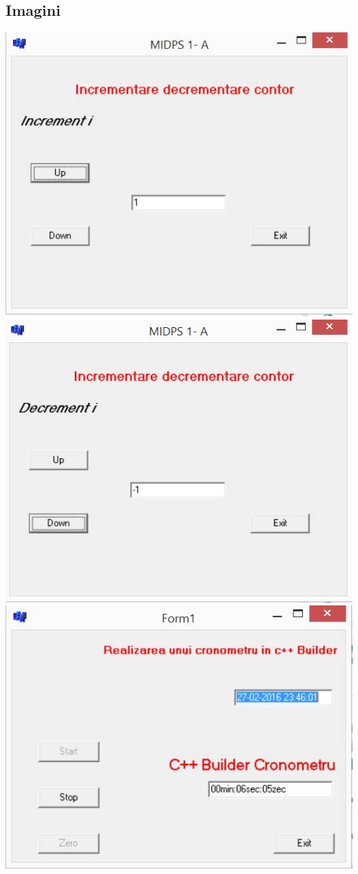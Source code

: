  
\subsection{Imagini}

\includegraphics{1.jpg}
\\
\includegraphics{2.jpg}
\\
\includegraphics{3.jpg}

